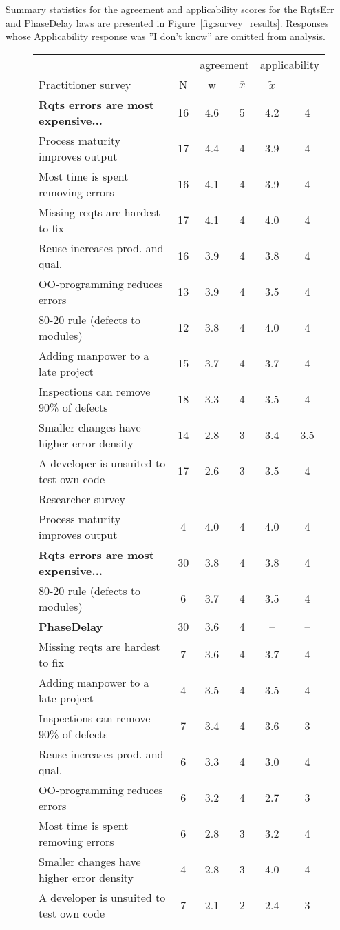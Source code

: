 Summary statistics for the agreement and applicability scores for the RqtsErr and PhaseDelay laws are presented in Figure~\ref{fig:survey_results}. Responses whose Applicability response was ''I don't know'' are omitted from analysis.


\begin{figure}[!ht] 
\scriptsize 
 
\begin{tabular}{l|c|c|c|c|c}
 &  & \multicolumn{2}{c|}{agreement} & \multicolumn{2}{c}{applicability} \\\cline{1-1} 
Practitioner survey  & N & w & $\bar{x}$ & $\tilde{x}$ \\
\hline 
\textbf{Rqts errors are most expensive...} & 16 & 4.6 & 5 & 4.2 & 4 \\ 
Process maturity improves output & 17 & 4.4 & 4 & 3.9 & 4 \\ 
Most time is spent removing errors & 16 & 4.1 & 4 & 3.9 & 4 \\ 
Missing reqts are hardest to fix & 17 & 4.1 & 4 & 4.0 & 4 \\
Reuse increases prod. and qual. & 16 & 3.9 & 4 & 3.8 & 4 \\
OO-programming reduces errors & 13 & 3.9 & 4 & 3.5 & 4 \\
80-20 rule (defects to modules) & 12 & 3.8 & 4 & 4.0 & 4 \\
Adding manpower to a late project & 15 & 3.7 & 4 & 3.7 & 4 \\
Inspections can remove 90\% of defects & 18 & 3.3 & 4 & 3.5 & 4 \\
Smaller changes have higher error density & 14 & 2.8 & 3 & 3.4 & 3.5 \\
A developer is unsuited to test own code & 17 & 2.6 & 3 & 3.5 & 4\\\hline
 
Researcher survey \\\hline 
Process maturity improves output & 4 & 4.0 & 4 & 4.0 & 4 \\
\textbf{Rqts errors are most expensive...} & 30 & 3.8 & 4 & 3.8 & 4   \\ 
80-20 rule (defects to modules) & 6 & 3.7 & 4 & 3.5 & 4 \\
\textbf{PhaseDelay} & 30 & 3.6 & 4 & -- & --  \\ 
Missing reqts are hardest to fix & 7 & 3.6 & 4 & 3.7 & 4 \\
Adding manpower to a late project & 4 & 3.5 & 4 & 3.5 & 4 \\
Inspections can remove 90\% of defects & 7 & 3.4 & 4 & 3.6 & 3 \\
Reuse increases prod. and qual. & 6 & 3.3 & 4 & 3.0 & 4 \\
OO-programming reduces errors & 6 & 3.2 & 4 & 2.7 & 3 \\
Most time is spent removing errors & 6 & 2.8 & 3 & 3.2 & 4 \\ 
Smaller changes have higher error density & 4 & 2.8 & 3 & 4.0 & 4 \\
A developer is unsuited to test own code & 7 & 2.1 & 2 & 2.4 & 3
\end{tabular} 
 

\end{figure}
